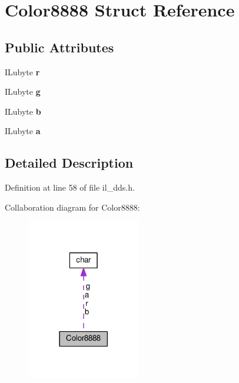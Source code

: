 \hypertarget{structColor8888}{}\section{Color8888 Struct Reference}
\label{structColor8888}
\subsection*{Public Attributes}
\begin{DoxyCompactItemize}
\item 
\mbox{\label{structColor8888_a4460c20173ca673cf48897c5265784fd}} 
I\+Lubyte {\bfseries r}
\item 
\mbox{\label{structColor8888_a2942c3ff04a46c7ef236ff49ab8af7f9}} 
I\+Lubyte {\bfseries g}
\item 
\mbox{\label{structColor8888_a8e459f4d5454ef71dc616df58c8f2a1c}} 
I\+Lubyte {\bfseries b}
\item 
\mbox{\label{structColor8888_a16df9bb1b43a838effd919326842e710}} 
I\+Lubyte {\bfseries a}
\end{DoxyCompactItemize}


\subsection{Detailed Description}


Definition at line 58 of file il\+\_\+dds.\+h.



Collaboration diagram for Color8888\+:
\nopagebreak
\begin{figure}[H]
\begin{center}
\leavevmode
\includegraphics[width=141pt]{d1/d80/structColor8888__coll__graph}
\end{center}
\end{figure}


